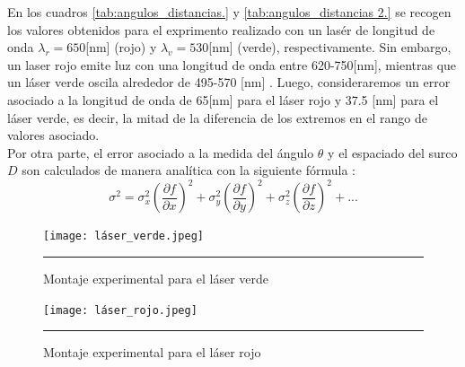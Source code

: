 \documentclass[10pt,a4paper]{article}
\begin{document}
\begin{multicols}{2}
		En los cuadros \ref{tab:angulos_distancias.} y \ref{tab:angulos_distancias 2.} se recogen los valores obtenidos para el exprimento realizado con un lasér de longitud de onda $\lambda_r = 650$[nm]  (rojo) y $\lambda_v = 530$[nm] (verde), respectivamente. Sin embargo, un laser rojo emite luz con una longitud de onda entre 620-750[nm], mientras que un láser verde oscila alrededor de 495-570 [nm] \cite{colors}. Luego, consideraremos un error asociado a la longitud de onda de 65[nm] para el láser rojo y 37.5 [nm] para el láser verde, es decir, la mitad de la diferencia de los extremos en el rango de valores asociado.\\
		
		Por otra parte, el error asociado a la medida del ángulo $\theta$ y el espaciado del surco $D$ son calculados de manera analítica con la siguiente fórmula \cite{error}:
		\begin{equation}\label{errores}
		\sigma^2 = \sigma^2_x \left( \frac{\partial f}{\partial x} \right)^2 + \sigma^2_y \left( \frac{\partial f}{\partial y} \right)^2 + \sigma^2_z \left( \frac{\partial f}{\partial z} \right)^2+...
		\end{equation}
		\newpage
		
		\begin{figure}[H]
			\centering
			\texttt{[image: láser\_verde.jpeg]}
			\caption{Montaje experimental para el láser verde}
			\label{imagen laser verde}
			\rule{80mm}{0.1mm}
		\end{figure}
		
		\begin{figure}[H]
			\centering
			\texttt{[image: láser\_rojo.jpeg]}
			\caption{Montaje experimental para el láser rojo}
			\label{imagen laser rojo}
			\rule{80mm}{0.1mm}
		\end{figure}
	
	
	
		
		
	\end{multicols}
	
\end{document}
